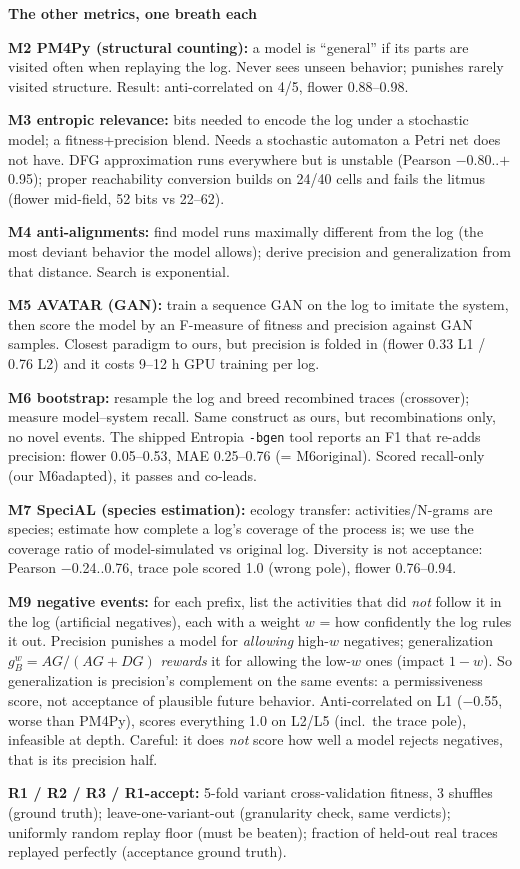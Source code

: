 \documentclass[10pt,twocolumn]{article}
\newcommand{\hdr}[1]{\vspace{5pt}\noindent\textcolor{hd}{\textbf{\large #1}}\par\vspace{2pt}}
\newcommand{\kv}[2]{\noindent\textbf{#1} #2\par}
\begin{document}
\hdr{The other metrics, one breath each}
\kv{M2 PM4Py (structural counting):}{a model is ``general'' if its parts are visited often when replaying the log. Never sees unseen behavior; punishes rarely visited structure. Result: anti-correlated on 4/5, flower 0.88--0.98.}
\kv{M3 entropic relevance:}{bits needed to encode the log under a stochastic model; a fitness+precision blend. Needs a stochastic automaton a Petri net does not have. DFG approximation runs everywhere but is unstable (Pearson $-$0.80..$+$0.95); proper reachability conversion builds on 24/40 cells and fails the litmus (flower mid-field, 52 bits vs 22--62).}
\kv{M4 anti-alignments:}{find model runs maximally different from the log (the most deviant behavior the model allows); derive precision and generalization from that distance. Search is exponential.}
\kv{M5 AVATAR (GAN):}{train a sequence GAN on the log to imitate the system, then score the model by an F-measure of fitness and precision against GAN samples. Closest paradigm to ours, but precision is folded in (flower 0.33 L1 / 0.76 L2) and it costs 9--12 h GPU training per log.}
\kv{M6 bootstrap:}{resample the log and breed recombined traces (crossover); measure model--system recall. Same construct as ours, but recombinations only, no novel events. The shipped Entropia \texttt{-bgen} tool reports an F1 that re-adds precision: flower 0.05--0.53, MAE 0.25--0.76 (= M6original). Scored recall-only (our M6adapted), it passes and co-leads.}
\kv{M7 SpeciAL (species estimation):}{ecology transfer: activities/N-grams are species; estimate how complete a log's coverage of the process is; we use the coverage ratio of model-simulated vs original log. Diversity is not acceptance: Pearson $-$0.24..0.76, trace pole scored 1.0 (wrong pole), flower 0.76--0.94.}
\kv{M9 negative events:}{for each prefix, list the activities that did \emph{not} follow it in the log (artificial negatives), each with a weight $w$ = how confidently the log rules it out. Precision punishes a model for \emph{allowing} high-$w$ negatives; generalization $g^w_B = AG/(AG{+}DG)$ \emph{rewards} it for allowing the low-$w$ ones (impact $1-w$). So generalization is precision's complement on the same events: a permissiveness score, not acceptance of plausible future behavior. Anti-correlated on L1 ($-$0.55, worse than PM4Py), scores everything 1.0 on L2/L5 (incl.\ the trace pole), infeasible at depth. Careful: it does \emph{not} score how well a model rejects negatives, that is its precision half.}
\kv{R1 / R2 / R3 / R1-accept:}{5-fold variant cross-validation fitness, 3 shuffles (ground truth); leave-one-variant-out (granularity check, same verdicts); uniformly random replay floor (must be beaten); fraction of held-out real traces replayed perfectly (acceptance ground truth).}
\end{document}
